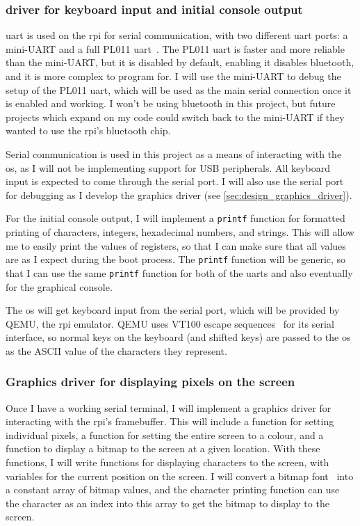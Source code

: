 \documentclass{article}
\begin{document}
\subsubsection{\texorpdfstring{}{UART} driver for keyboard
input and initial console output}
\gls{uart} is used on the \gls{rpi} for serial communication, with two
different \gls{uart} ports: a mini-UART and a full PL011
\gls{uart}~\cite{rpi-uarts}. The PL011 \gls{uart} is faster and more reliable
than the mini-UART, but it is disabled by default, enabling it disables
bluetooth, and it is more complex to program for. I will use the mini-UART to
debug the setup of the PL011 \gls{uart}, which will be used as the main serial
connection once it is enabled and working. I won't be using bluetooth in this
project, but future projects which expand on my code could switch back to the
mini-UART if they wanted to use the \gls{rpi}'s bluetooth chip.

Serial communication is used in this project as a means of interacting with the
\gls{os}, as I will not be implementing support for USB peripherals. All
keyboard input is expected to come through the serial port. I will also use the
serial port for debugging as I develop the graphics driver (see
\autoref{sec:design_graphics_driver}).

For the initial console output, I will implement a \texttt{printf} function for
formatted printing of characters, integers, hexadecimal numbers, and strings.
This will allow me to easily print the values of registers, so that I can make
sure that all values are as I expect during the boot process. The
\texttt{printf} function will be generic, so that I can use the same
\texttt{printf} function for both of the \glspl{uart} and also eventually for
the graphical console.

The \gls{os} will get keyboard input from the serial port, which will be
provided by QEMU, the \gls{rpi} emulator. QEMU uses VT100 escape
sequences~\cite{vt100} for its serial interface, so normal keys on the keyboard
(and shifted keys) are passed to the \gls{os} as the ASCII value of the
characters they represent.

\subsubsection{Graphics driver for displaying pixels on the screen}
\label{sec:design_graphics_driver}
Once I have a working serial terminal, I will implement a graphics driver for
interacting with the \gls{rpi}'s framebuffer. This will include a function for
setting individual pixels, a function for setting the entire screen to a
colour, and a function to display a bitmap to the screen at a given location.
With these functions, I will write functions for displaying characters to the
screen, with variables for the current position on the screen. I will convert a
bitmap font~\cite{bizcat-font} into a constant array of bitmap values, and the
character printing function can use the character as an index into this array
to get the bitmap to display to the screen.
\end{document}

